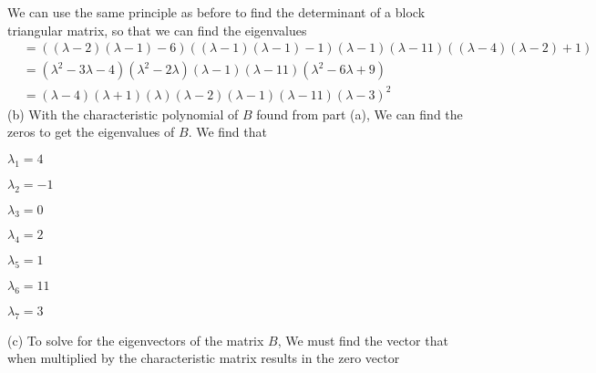 \documentclass{report}
\begin{document}
We can use the same principle as before to find the determinant of a block triangular matrix,  so that we can find the eigenvalues
\begin{align*}
& = ((\lambda-2)(\lambda-1)-6)((\lambda-1)(\lambda-1)-1)(\lambda-1)(\lambda-11)((\lambda-4)(\lambda-2)+1) \\
& = (\lambda^2 -3\lambda -4)(\lambda^2-2\lambda)(\lambda-1)(\lambda-11)(\lambda^2-6\lambda+9) \\
& = (\lambda-4)(\lambda+1)(\lambda)(\lambda-2)(\lambda-1)(\lambda-11)(\lambda-3)^2
\end{align*}
(b) With the characteristic polynomial of $B$ found from part (a),  We can find the zeros to get the eigenvalues of $B$.  We find that
\begin{itemize}
\begin{minipage}[t]{0.5\textwidth}
\item $\lambda_1=4$
\item $\lambda_2=-1$
\item $\lambda_3=0$
\item $\lambda_4=2$
\end{minipage}
\begin{minipage}[t]{0.5\textwidth}
\item $\lambda_5=1$
\item $\lambda_6=11$
\item $\lambda_7=3$
\end{minipage}
\end{itemize}
(c) To solve for the eigenvectors of the matrix $B$,  We must find the vector that when multiplied by the characteristic matrix results in the zero vector
\end{document}
